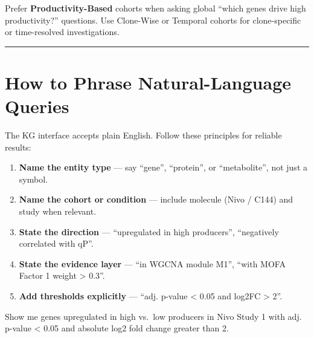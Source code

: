\documentclass[
  letterpaper,
  oneside,
  open=any]{scrbook}
\providecommand{\tightlist}{%
  \setlength{\itemsep}{0pt}\setlength{\parskip}{0pt}}
\begin{document}
\begin{tcolorbox}[enhanced jigsaw, arc=.35mm, bottomrule=.15mm, bottomtitle=1mm, breakable, colback=white, colbacktitle=quarto-callout-tip-color!10!white, colframe=quarto-callout-tip-color-frame, coltitle=black, left=2mm, leftrule=.75mm, opacityback=0, opacitybacktitle=0.6, rightrule=.15mm, title=\textcolor{quarto-callout-tip-color}{\faLightbulb}\hspace{0.5em}{Tip}, titlerule=0mm, toprule=.15mm, toptitle=1mm]

Prefer \textbf{Productivity-Based} cohorts when asking global ``which
genes drive high productivity?'' questions. Use Clone-Wise or Temporal
cohorts for clone-specific or time-resolved investigations.

\end{tcolorbox}

\begin{center}\rule{0.5\linewidth}{0.5pt}\end{center}

\section{How to Phrase Natural-Language Queries}\label{sec-query-tips}

The KG interface accepts plain English. Follow these principles for
reliable results:

\begin{enumerate}
\def\labelenumi{\arabic{enumi}.}
\tightlist
\item
  \textbf{Name the entity type} --- say ``gene'', ``protein'', or
  ``metabolite'', not just a symbol.
\item
  \textbf{Name the cohort or condition} --- include molecule (Nivo /
  C144) and study when relevant.
\item
  \textbf{State the direction} --- ``upregulated in high producers'',
  ``negatively correlated with qP''.
\item
  \textbf{State the evidence layer} --- ``in WGCNA module M1'', ``with
  MOFA Factor 1 weight \textgreater{} 0.3''.
\item
  \textbf{Add thresholds explicitly} --- ``adj. p-value \textless{} 0.05
  and \textbar log2FC\textbar{} \textgreater{} 2''.
\end{enumerate}

Show me genes upregulated in high vs.~low producers in Nivo Study 1 with
adj. p-value \textless{} 0.05 and absolute log2 fold change greater than
2.
\end{document}
